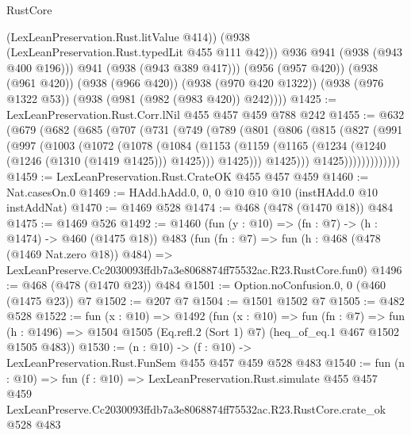 \begin{lexlean}{RustCore}
\begin{coremodule}
                (LexLeanPreservation.Rust.litValue @414))
              (@938 (LexLeanPreservation.Rust.typedLit @455 @111 @42)))
            @936
            @941
            (@938 (@943 @400 @196)))
          @941
          (@938 (@943 @389 @417)))
        (@956 (@957 @420))
        (@938 (@961 @420))
        (@938 (@966 @420))
        (@938 (@970 @420 @1322))
        (@938 (@976 @1322 @53))
        (@938 (@981 (@982 (@983 @420)) @242))))
@1425 := LexLeanPreservation.Rust.Corr.lNil @455 @457 @459 @788 @242
@1455 := @632
    (@679
      (@682
        (@685
          (@707
            (@731
              (@749
                (@789
                  (@801
                    (@806
                      (@815
                        (@827
                          (@991
                            (@997
                              (@1003
                                (@1072
                                  (@1078
                                    (@1084
                                      (@1153
                                        (@1159
                                          (@1165
                                            (@1234 (@1240 (@1246 (@1310 (@1419 @1425))) @1425)))
                                          @1425)))
                                    @1425)))
                              @1425)))))))))))))
@1459 := LexLeanPreservation.Rust.CrateOK @455 @457 @459
@1460 := Nat.casesOn.{0}
@1469 := HAdd.hAdd.{0, 0, 0} @10 @10 @10 (instHAdd.{0} @10 instAddNat)
@1470 := @1469 @528
@1474 := @468 (@478 (@1470 @18)) @484
@1475 := @1469 @526
@1492 := @1460
    (fun (y : @10) => (fn : @7) -> (h : @1474) -> @460 (@1475 @18))
    @483
    (fun (fn : @7) =>
    fun (h : @468 (@478 (@1469 Nat.zero @18)) @484) =>
    LexLeanPreserve.Cc2030093ffdb7a3e8068874ff75532ac.R23.RustCore.fun0)
@1496 := @468 (@478 (@1470 @23)) @484
@1501 := Option.noConfusion.{0, 0} (@460 (@1475 @23)) @7
@1502 := @207 @7
@1504 := @1501 @1502 @7
@1505 := @482 @528
@1522 := fun (x : @10) =>
  @1492
    (fun (x : @10) =>
    fun (fn : @7) =>
    fun (h : @1496) => @1504 @1505 (Eq.refl.{2} (Sort 1) @7) (heq_of_eq.{1} @467 @1502 @1505 @483))
@1530 := (n : @10) -> (f : @10) -> LexLeanPreservation.Rust.FunSem @455 @457 @459 @528 @483
@1540 := fun (n : @10) =>
  fun (f : @10) =>
  LexLeanPreservation.Rust.simulate
    @455
    @457
    @459
    LexLeanPreserve.Cc2030093ffdb7a3e8068874ff75532ac.R23.RustCore.crate_ok
    @528
    @483
\end{coremodule}
\end{lexlean}
